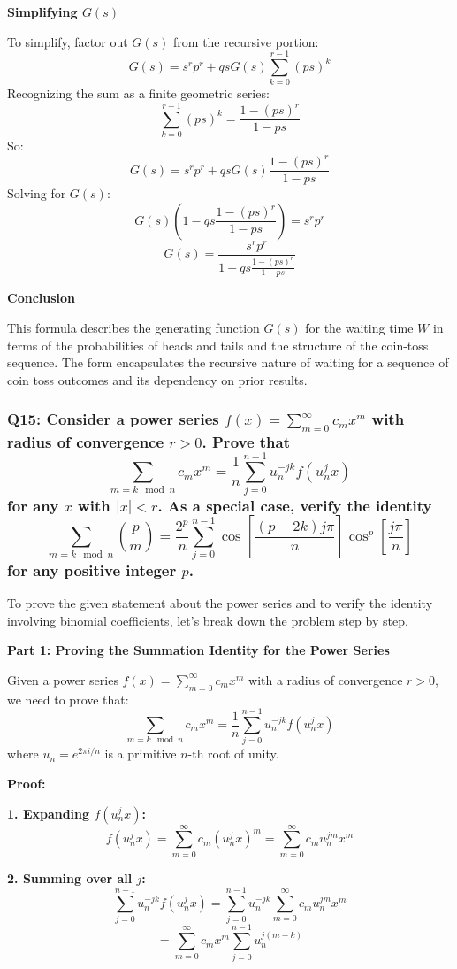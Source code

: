 \documentclass[8pt]{article}
\begin{document}
\textbf{Simplifying \( G(s) \)}

To simplify, factor out \( G(s) \) from the recursive portion:
\[ G(s) = s^r p^r + q s G(s) \sum_{k=0}^{r-1} (ps)^k \]
Recognizing the sum as a finite geometric series:
\[ \sum_{k=0}^{r-1} (ps)^k = \frac{1-(ps)^r}{1-ps} \]
So:
\[ G(s) = s^r p^r + q s G(s) \frac{1-(ps)^r}{1-ps} \]
Solving for \( G(s) \):
\[ G(s) (1 - qs \frac{1-(ps)^r}{1-ps}) = s^r p^r \]
\[ G(s) = \frac{s^r p^r}{1 - qs \frac{1-(ps)^r}{1-ps}} \]

\textbf{Conclusion}

This formula describes the generating function \( G(s) \) for the waiting time \( W \) in terms of the probabilities of heads and tails and the structure of the coin-toss sequence. The form encapsulates the recursive nature of waiting for a sequence of coin toss outcomes and its dependency on prior results.

\subsubsection*{Q15:
Consider a power series \( f(x) = \sum_{m=0}^{\infty} c_m x^m \) with radius of convergence \( r > 0 \). Prove that
\[
\sum_{m = k \mod n} c_m x^m = \frac{1}{n} \sum_{j=0}^{n-1} u_n^{-jk} f(u_n^j x)
\]
for any \( x \) with \( |x| < r \). As a special case, verify the identity
\[
\sum_{m = k \mod n} \binom{p}{m} = \frac{2^p}{n} \sum_{j=0}^{n-1} \cos \left[ \frac{(p - 2k)j\pi}{n} \right] \cos^p \left[ \frac{j\pi}{n} \right]
\]
for any positive integer \( p \).}

To prove the given statement about the power series and to verify the identity involving binomial coefficients, let's break down the problem step by step.

\textbf{Part 1: Proving the Summation Identity for the Power Series}

Given a power series \( f(x) = \sum_{m=0}^{\infty} c_m x^m \) with a radius of convergence \( r > 0 \), we need to prove that:
\[
\sum_{m = k \mod n} c_m x^m = \frac{1}{n} \sum_{j=0}^{n-1} u_n^{-jk} f(u_n^j x)
\]
where \( u_n = e^{2\pi i/n} \) is a primitive \( n \)-th root of unity.

\textbf{Proof:}

\textbf{1. Expanding \( f(u_n^j x) \):}
   \[
   f(u_n^j x) = \sum_{m=0}^{\infty} c_m (u_n^j x)^m = \sum_{m=0}^{\infty} c_m u_n^{jm} x^m
   \]

\textbf{2. Summing over all \( j \):}
   \[
   \sum_{j=0}^{n-1} u_n^{-jk} f(u_n^j x) = \sum_{j=0}^{n-1} u_n^{-jk} \sum_{m=0}^{\infty} c_m u_n^{jm} x^m
   \]
   \[
   = \sum_{m=0}^{\infty} c_m x^m \sum_{j=0}^{n-1} u_n^{j(m-k)}
   \]
\end{document}

